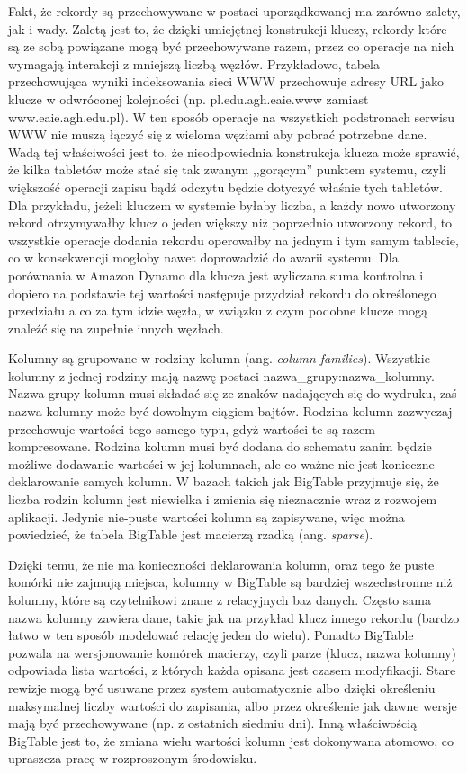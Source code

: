 Fakt, że rekordy są przechowywane w postaci uporządkowanej ma zarówno zalety, jak i wady.
Zaletą jest to, że dzięki umiejętnej konstrukcji kluczy, rekordy które są ze sobą powiązane mogą być przechowywane razem, przez co operacje na nich wymagają interakcji z mniejszą liczbą węzłów.
Przykładowo, tabela przechowująca wyniki indeksowania sieci WWW przechowuje adresy URL jako klucze w odwróconej kolejności (np. pl.edu.agh.eaie.www zamiast www.eaie.agh.edu.pl).
W ten sposób operacje na wszystkich podstronach serwisu WWW nie muszą łączyć się z wieloma węzłami aby pobrać potrzebne dane.
Wadą tej właściwości jest to, że nieodpowiednia konstrukcja klucza może sprawić, że kilka tabletów może stać się tak zwanym ,,gorącym'' punktem systemu, czyli większość operacji zapisu bądź odczytu będzie dotyczyć właśnie tych tabletów.
Dla przykładu, jeżeli kluczem w systemie byłaby liczba, a każdy nowo utworzony rekord otrzymywałby klucz o jeden większy niż poprzednio utworzony rekord, to wszystkie operacje dodania rekordu operowałby na jednym i tym samym tablecie, co w konsekwencji mogłoby nawet doprowadzić do awarii systemu.
Dla porównania w Amazon Dynamo dla klucza jest wyliczana suma kontrolna i dopiero na podstawie tej wartości następuje przydział rekordu do określonego przedziału a co za tym idzie węzła, w związku z czym podobne klucze mogą znaleźć się na zupełnie innych węzłach.

Kolumny są grupowane w rodziny kolumn (ang. \emph{column families}).
Wszystkie kolumny z jednej rodziny mają nazwę postaci nazwa\_grupy:nazwa\_kolumny.
Nazwa grupy kolumn musi składać się ze znaków nadających się do wydruku, zaś nazwa kolumny może być dowolnym ciągiem bajtów.
Rodzina kolumn zazwyczaj przechowuje wartości tego samego typu, gdyż wartości te są razem kompresowane.
Rodzina kolumn musi być dodana do schematu zanim będzie możliwe dodawanie wartości w jej kolumnach, ale co ważne nie jest konieczne deklarowanie samych kolumn.
W bazach takich jak BigTable przyjmuje się, że liczba rodzin kolumn jest niewielka i zmienia się nieznacznie wraz z rozwojem aplikacji.
Jedynie nie-puste wartości kolumn są zapisywane, więc można powiedzieć, że tabela BigTable jest macierzą rzadką (ang. \emph{sparse}).

Dzięki temu, że nie ma konieczności deklarowania kolumn, oraz tego że puste komórki nie zajmują miejsca, kolumny w BigTable są bardziej wszechstronne niż kolumny, które są czytelnikowi znane z relacyjnych baz danych.
Często sama nazwa kolumny zawiera dane, takie jak na przykład klucz innego rekordu (bardzo łatwo w ten sposób modelować relację jeden do wielu).
Ponadto BigTable pozwala na wersjonowanie komórek macierzy, czyli parze (klucz, nazwa kolumny) odpowiada lista wartości, z których każda opisana jest czasem modyfikacji.
Stare rewizje mogą być usuwane przez system automatycznie albo dzięki określeniu maksymalnej liczby wartości do zapisania, albo przez określenie jak dawne wersje mają być przechowywane (np. z ostatnich siedmiu dni).
Inną właściwością BigTable jest to, że zmiana wielu wartości kolumn jest dokonywana atomowo, co upraszcza pracę w rozproszonym środowisku.

